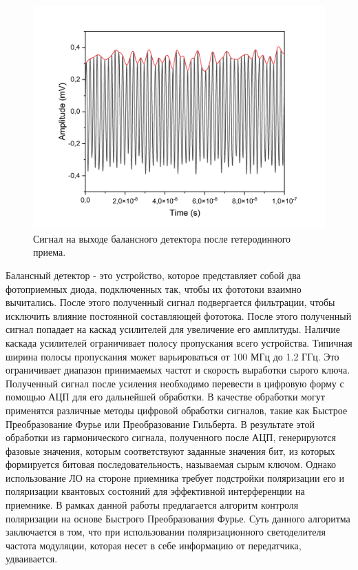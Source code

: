 \begin{figure}
    \centering
    \includegraphics[width=\textwidth]{images/balanced output heterodyne.png}
    \caption{Сигнал на выходе балансного детектора после гетеродинного приема.}
    \label{fig:het time output}
\end{figure}
\newline Балансный детектор - это устройство, которое  представляет собой два фотоприемных диода, подключенных так, чтобы их фототоки взаимно вычитались. После этого полученный сигнал подвергается фильтрации, чтобы исключить влияние постоянной составляющей фототока. После этого полученный сигнал попадает на каскад усилителей для увеличение его амплитуды. Наличие каскада усилителей ограничивает полосу пропускания всего устройства. Типичная ширина полосы пропускания может варьироваться от 100 МГц до 1.2 ГГц. Это ограничивает диапазон принимаемых частот и скорость выработки сырого ключа. 
\newline Полученный сигнал после усиления необходимо перевести в цифровую форму с помощью АЦП для его дальнейшей обработки. В качестве обработки могут применятся различные методы цифровой обработки сигналов, такие как Быстрое Преобразование Фурье или Преобразование Гильберта. В результате этой обработки из гармонического сигнала, полученного после АЦП, генерируются фазовые значения, которым соответствуют заданные значения бит, из которых формируется битовая последовательность, называемая сырым ключом. 
Однако использование ЛО на стороне приемника требует подстройки поляризации его и поляризации квантовых состояний для эффективной интерференции на приемнике. В рамках данной работы предлагается алгоритм контроля поляризации на основе Быстрого Преобразования Фурье. Суть данного алгоритма заключается в том, что при использовании поляризационного светоделителя частота модуляции, которая несет в себе информацию от передатчика, удваивается.
